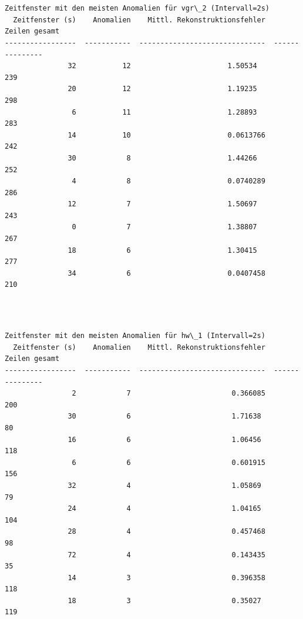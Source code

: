 \documentclass[11pt]{article}
\begin{document}
    \begin{center}
    \end{center}
    { \hspace*{\fill} \\}
    
    \begin{Verbatim}[commandchars=\\\{\}]

Zeitfenster mit den meisten Anomalien für vgr\_2 (Intervall=2s)
  Zeitfenster (s)    Anomalien    Mittl. Rekonstruktionsfehler    Zeilen gesamt
-----------------  -----------  ------------------------------  ---------------
               32           12                       1.50534                239
               20           12                       1.19235                298
                6           11                       1.28893                283
               14           10                       0.0613766              242
               30            8                       1.44266                252
                4            8                       0.0740289              286
               12            7                       1.50697                243
                0            7                       1.38807                267
               18            6                       1.30415                277
               34            6                       0.0407458              210
    \end{Verbatim}

    \begin{center}
    \end{center}
    { \hspace*{\fill} \\}
    
    \begin{Verbatim}[commandchars=\\\{\}]

Zeitfenster mit den meisten Anomalien für hw\_1 (Intervall=2s)
  Zeitfenster (s)    Anomalien    Mittl. Rekonstruktionsfehler    Zeilen gesamt
-----------------  -----------  ------------------------------  ---------------
                2            7                        0.366085              200
               30            6                        1.71638                80
               16            6                        1.06456               118
                6            6                        0.601915              156
               32            4                        1.05869                79
               24            4                        1.04165               104
               28            4                        0.457468               98
               72            4                        0.143435               35
               14            3                        0.396358              118
               18            3                        0.35027               119
    \end{Verbatim}
\end{document}
